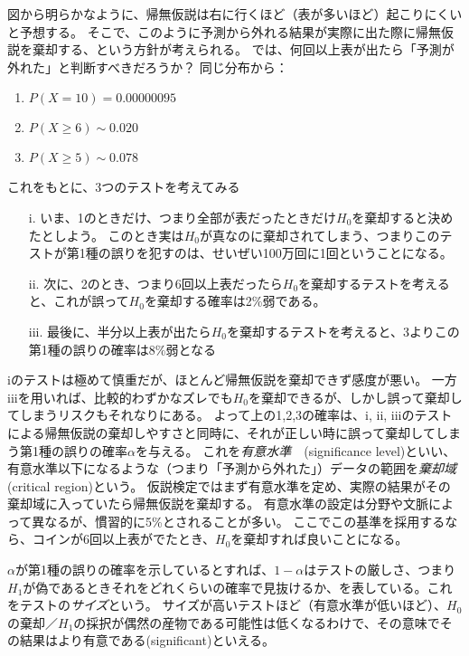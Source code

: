 \documentclass{jsarticle}
\begin{document}
図から明らかなように、帰無仮説は右に行くほど（表が多いほど）起こりにくいと予想する。
そこで、このように予測から外れる結果が実際に出た際に帰無仮説を棄却する、という方針が考えられる。
では、何回以上表が出たら「予測が外れた」と判断すべきだろうか？
同じ分布から：
\begin{enumerate}
 \item $P(X=10) = 0.00000095$
 \item $P(X \geq 6) \sim 0.020$
 \item $P(X \geq 5) \sim 0.078$
\end{enumerate}

これをもとに、3つのテストを考えてみる
\begin{itemize}
 \item[i. ] いま、1のときだけ、つまり全部が表だったときだけ$H_0$を棄却すると決めたとしよう。
       このとき実は$H_0$が真なのに棄却されてしまう、つまりこのテストが第1種の誤りを犯すのは、せいぜい100万回に1回ということになる。
 \item[ii. ] 次に、2のとき、つまり6回以上表だったら$H_0$を棄却するテストを考えると、これが誤って$H_0$を棄却する確率は2\%弱である。
 \item[iii. ] 最後に、半分以上表が出たら$H_0$を棄却するテストを考えると、3よりこの第1種の誤りの確率は8\%弱となる
\end{itemize}

iのテストは極めて慎重だが、ほとんど帰無仮説を棄却できず感度が悪い。
一方iiiを用いれば、比較的わずかなズレでも$H_0$を棄却できるが、しかし誤って棄却してしまうリスクもそれなりにある。
よって上の1,2,3の確率は、i, ii, iiiのテストによる帰無仮説の棄却しやすさと同時に、それが正しい時に誤って棄却してしまう第1種の誤りの確率$\alpha$を与える。
これを\emph{有意水準}　(significance level)といい、有意水準以下になるような（つまり「予測から外れた」）データの範囲を\emph{棄却域}(critical region)という。
仮説検定ではまず有意水準を定め、実際の結果がその棄却域に入っていたら帰無仮説を棄却する。
有意水準の設定は分野や文脈によって異なるが、慣習的に5\%とされることが多い。
ここでこの基準を採用するなら、コインが6回以上表がでたとき、$H_0$を棄却すれば良いことになる。

$\alpha$が第1種の誤りの確率を示しているとすれば、$1-\alpha$はテストの厳しさ、つまり$H_1$が偽であるときそれをどれくらいの確率で見抜けるか、を表している。これをテストの\emph{サイズ}という。
サイズが高いテストほど（有意水準が低いほど）、$H_0$の棄却／$H_1$の採択が偶然の産物である可能性は低くなるわけで、その意味でその結果はより有意である(significant)といえる。
\end{document}
